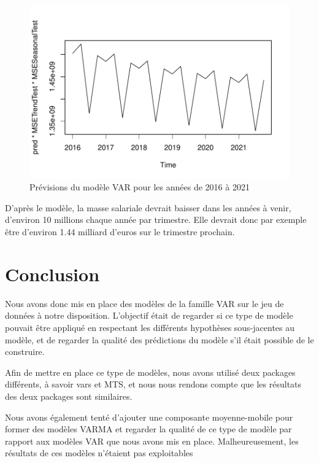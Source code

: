 \documentclass[11pt,]{article}
\begin{document}
\begin{figure}[htbp]
\centering
\includegraphics{Rapport_final_files/figure-latex/unnamed-chunk-50-1.pdf}
\caption{\label{fig30} Prévisions du modèle VAR pour les années de 2016
à 2021}
\end{figure}

D'après le modèle, la masse salariale devrait baisser dans les années à
venir, d'environ 10 millions chaque année par trimestre. Elle devrait
donc par exemple être d'environ 1.44 milliard d'euros sur le trimestre
prochain.

\newpage

\section*{Conclusion}\label{conclusion}

Nous avons donc mis en place des modèles de la famille VAR sur le jeu de
données à notre disposition. L'objectif était de regarder si ce type de
modèle pouvait être appliqué en respectant les différents hypothèses
sous-jacentes au modèle, et de regarder la qualité des prédictions du
modèle s'il était possible de le construire.

Afin de mettre en place ce type de modèles, nous avons utilisé deux
packages différents, à savoir vars et MTS, et nous nous rendons compte
que les résultats des deux packages sont similaires.

Nous avons également tenté d'ajouter une composante moyenne-mobile pour
former des modèles VARMA et regarder la qualité de ce type de modèle par
rapport aux modèles VAR que nous avons mis en place. Malheureusement,
les résultats de ces modèles n'étaient pas exploitables
\end{document}
